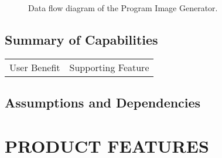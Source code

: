 \documentclass[a4paper,twoside]{tce}
\begin{document}
\begin{figure}[tb]
\centerline{}
\caption{Data flow diagram of the Program Image Generator.}
\label{fig:data_flow}
\end{figure}

\section{Summary of Capabilities}




\begin{center}
\begin{longtable}{p{}p{}}
  User Benefit                 &       Supporting Feature \\
\end{longtable}
\end{center}

\section{Assumptions and Dependencies}





\chapter{PRODUCT FEATURES}
\end{document}
